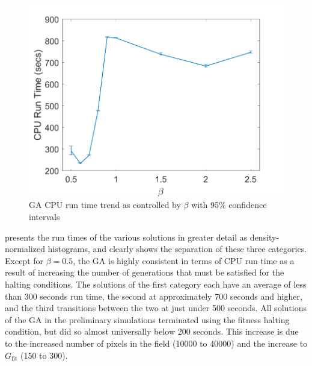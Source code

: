 \documentclass[12pt,dvipsnames]{report}
\begin{document}
\begin{figure}[htp]
	\centering
	\includegraphics[height=0.4\textheight]{Figures/CaseI_GARunTime50_Errorbar}
	\caption[Case I GA CPU run time trends]{GA CPU run time trend as controlled by $\beta$ with 95\% confidence intervals}
	\label{fig:CaseI_GARunTimeErrorbar}
\end{figure}

 presents the run times of the various solutions in greater detail as density-normalized histograms, and clearly shows the separation of these three categories.  Except for $\beta = 0.5$, the GA is highly consistent in terms of CPU run time as a result of increasing the number of generations that must be satisfied for the halting conditions.  The solutions of the first category each have an average of less than 300 seconds run time, the second at approximately 700 seconds and higher, and the third transitions between the two at just under 500 seconds.  All solutions of the GA in the preliminary simulations terminated using the fitness halting condition, but did so almost universally below 200 seconds.  This increase is due to the increased number of pixels in the field (10000 to 40000) and the increase to $G_{\text{fit}}$ (150 to 300).
\end{document}
